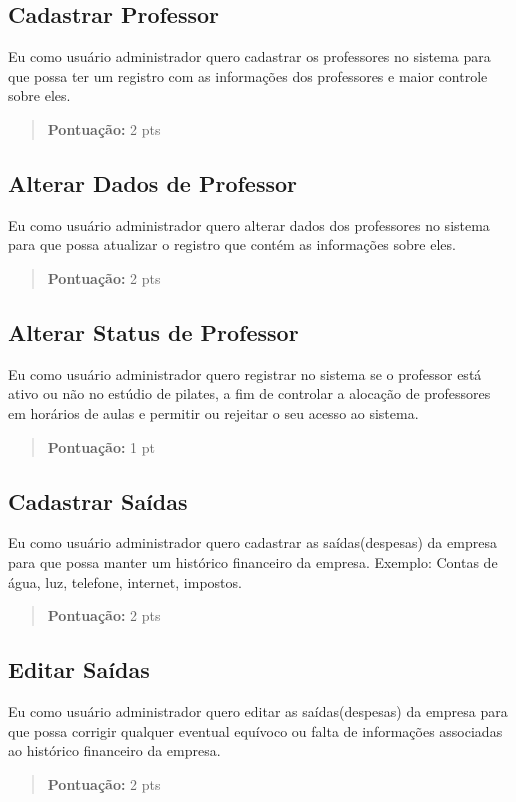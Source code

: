 \subsection[Cadastrar Professor]{Cadastrar Professor}
Eu como usuário administrador quero cadastrar os professores no sistema para
que possa ter um registro com as informações dos professores e maior controle
sobre eles.
\begin{quote}
    \textbf{Pontuação:} 2 pts
\end{quote}

\subsection[Alterar Dados de Professor]{Alterar Dados de Professor}
Eu como usuário administrador quero alterar dados dos professores no sistema
para que possa atualizar o registro que contém as informações sobre eles.
\begin{quote}
    \textbf{Pontuação:} 2 pts
\end{quote}

\subsection[Alterar Status de Professor]{Alterar Status de Professor}
Eu como usuário administrador quero registrar no sistema se o professor está
ativo ou não no estúdio de pilates, a fim de controlar a alocação de
professores em horários de aulas e permitir ou rejeitar o seu acesso ao sistema.
\begin{quote}
    \textbf{Pontuação:} 1 pt
\end{quote}

\subsection[Cadastrar Saídas]{Cadastrar Saídas}
Eu como usuário administrador quero cadastrar as saídas(despesas) da empresa para que
possa manter um histórico financeiro da empresa.
Exemplo: Contas de água, luz, telefone, internet, impostos.
\begin{quote}
    \textbf{Pontuação:} 2 pts
\end{quote}

\subsection[Editar Saídas]{Editar Saídas}
Eu como usuário administrador quero editar as saídas(despesas) da empresa para que possa
corrigir qualquer eventual equívoco ou falta de informações associadas ao
histórico financeiro da empresa.
\begin{quote}
    \textbf{Pontuação:} 2 pts
\end{quote}

